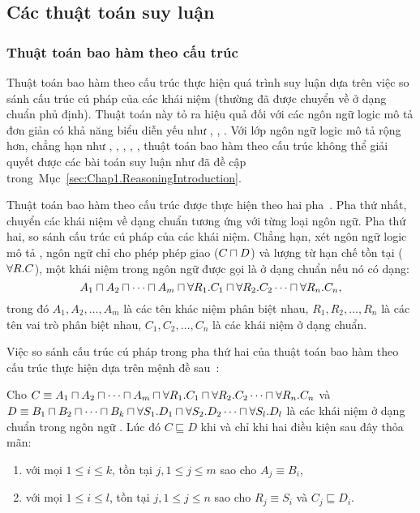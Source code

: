 \subsection{Các thuật toán suy luận}
\label{sec:Chap1.Algorithm}

\subsubsection{Thuật toán bao hàm theo cấu trúc}
\label{sec:Chap1.StructuralSubsumption}
Thuật toán bao hàm theo cấu trúc thực hiện quá trình suy luận dựa trên việc so sánh cấu trúc cú pháp của các khái niệm (thường đã được chuyển về ở dạng chuẩn phủ định). Thuật toán này tỏ ra hiệu quả đối với các ngôn ngữ logic mô tả đơn giản có khả năng biểu diễn yếu như \FLzero, \FLbot, \ALN. Với lớp ngôn ngữ logic mô tả rộng hơn, chẳng hạn như \ALC, \ALCI, \ALCIQ, \SHIQ, \SHOIQ, thuật toán bao hàm theo cấu trúc không thể giải quyết được các bài toán suy luận như đã đề cập trong~Mục~\ref{sec:Chap1.ReasoningIntroduction}.

Thuật toán bao hàm theo cấu trúc được thực hiện theo hai pha~\cite{DLHandbook2007}. Pha thứ nhất, chuyển các khái niệm về dạng chuẩn tương ứng với từng loại ngôn ngữ. Pha thứ hai, so sánh cấu trúc cú pháp của các khái niệm. Chẳng hạn, xét ngôn ngữ logic mô tả \FLzero, ngôn ngữ chỉ cho phép phép giao ($C \sqcap D$) và lượng từ hạn chế tồn tại ($\forall R.C$), một khái niệm trong ngôn ngữ \FLzero được gọi là ở dạng chuẩn nếu nó có dạng:
$$A_1 \sqcap A_2 \sqcap \cdots \sqcap A_m \sqcap \forall R_1.C_1 \sqcap \forall R_2.C_2 \cdots \sqcap \forall R_n.C_n,$$
trong đó $A_1, A_2, \ldots, A_m$ là các tên khác niệm phân biệt nhau, $R_1, R_2, \ldots, R_n$ là các tên vai trò phân biệt nhau, $C_1, C_2, \ldots, C_n$ là các khái niệm ở dạng chuẩn.

Việc so sánh cấu trúc cú pháp trong pha thứ hai của thuật toán bao hàm theo cấu trúc thực hiện dựa trên mệnh đề sau~\cite{DLHandbook2007}:

\begin{Proposition}
	Cho $C \equiv A_1 \sqcap A_2 \sqcap \cdots \sqcap A_m \sqcap \forall R_1.C_1 \sqcap \forall R_2.C_2 \cdots \sqcap \forall R_n.C_n$ và $D \equiv B_1 \sqcap B_2 \sqcap \cdots \sqcap B_k \sqcap \forall S_1.D_1 \sqcap \forall S_2.D_2 \cdots \sqcap \forall S_l.D_l$ là các khái niệm ở dạng chuẩn trong ngôn ngữ \FLzero. Lúc đó $C \sqsubseteq D$ khi và chỉ khi hai điều kiện sau đây thỏa mãn:
	\begin{enumerate}
		\item với mọi $1 \leq i \leq k$, tồn tại $j, 1 \leq j \leq m$ sao cho $A_j \equiv B_i$,
		\item với mọi $1 \leq i \leq l$, tồn tại $j, 1 \leq j \leq n$ sao cho $R_j \equiv S_i$ và $C_j \sqsubseteq D_i$.\myend
	\end{enumerate}	
\end{Proposition}

